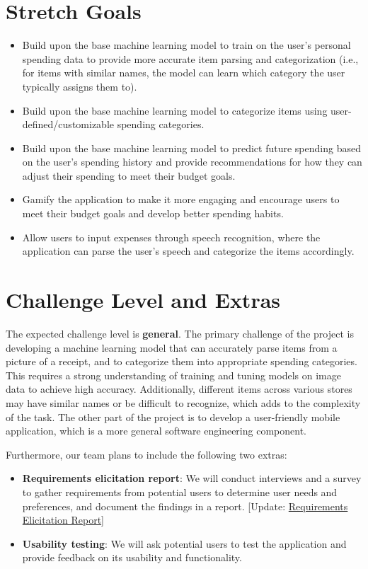 \documentclass{article}
\begin{document}
\section{Stretch Goals}
\begin{itemize}
    \item Build upon the base machine learning model to train on the user's
    personal spending data to provide more accurate item parsing and
    categorization (i.e., for items with similar names, the model can learn
    which category the user typically assigns them to).
    \item Build upon the base machine learning model to categorize items using
    user-defined/customizable spending categories.
    \item Build upon the base machine learning model to predict future spending
    based on the user's spending history and provide recommendations for how
    they can adjust their spending to meet their budget goals.
    \item Gamify the application to make it more engaging and encourage users to
    meet their budget goals and develop better spending habits.
    \item Allow users to input expenses through speech recognition, where the
    application can parse the user's speech and categorize the items
    accordingly.
\end{itemize}

\section{Challenge Level and Extras}

The expected challenge level is \textbf{general}. The primary challenge of the
project is developing a machine learning model that can accurately parse items
from a picture of a receipt, and to categorize them into appropriate spending
categories. This requires a strong understanding of training and tuning models
on image data to achieve high accuracy. Additionally, different items across
various stores may have similar names or be difficult to recognize, which adds
to the complexity of the task. The other part of the project is to develop a
user-friendly mobile application, which is a more general software engineering
component.

Furthermore, our team plans to include the following two extras:
\begin{itemize}
    \item \textbf{Requirements elicitation report}: We will conduct interviews
    and a survey to gather requirements from potential users to determine user
    needs and preferences, and document the findings in a report. [Update:
    \href{https://github.com/PlutosCapstone/Plutos/tree/main/docs/Extras/RequirementsElicitationReport.pdf}{Requirements
    Elicitation Report}]
    \item \textbf{Usability testing}: We will ask potential users to test the
    application and provide feedback on its usability and functionality.

\end{itemize}
\end{document}
